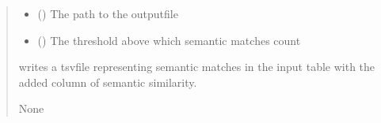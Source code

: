 \documentclass[letterpaper,10pt,english]{sphinxmanual}
\begin{document}
\begin{fulllineitems}
\begin{quote}
\begin{description}
\begin{itemize}
\item {} 
\sphinxAtStartPar
{} () \textendash{} The path to the output\sphinxhyphen{}file

\item {} 
\sphinxAtStartPar
{} (\sphinxstyleliteralemphasis{\sphinxupquote{, }}) \textendash{} The threshold above which semantic matches count

\end{itemize}

\sphinxAtStartPar
writes a tsv\sphinxhyphen{}file representing semantic
matches in the input table with the added column of
semantic similarity.

\sphinxAtStartPar
None

\end{description}\end{quote}

\sphinxAtStartPar
{}


\end{fulllineitems}
\end{document}
